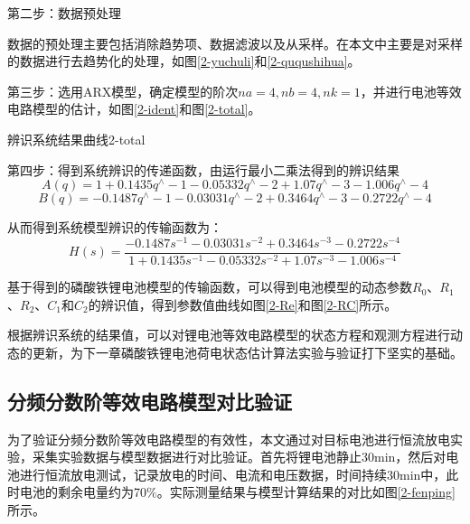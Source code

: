 第二步：数据预处理

数据的预处理主要包括消除趋势项、数据滤波以及从采样。在本文中主要是对采样的数据进行去趋势化的处理，如图\ref{2-yuchuli}和\ref{2-ququshihua}。

第三步：选用ARX模型，确定模型的阶次$na=4,nb=4,nk=1$，并进行电池等效电路模型的估计，如图\ref{2-ident}和图\ref{2-total}。

\begin{pics}[htbp]{辨识系统结果曲线}{2-total}
\end{pics}


第四步：得到系统辨识的传递函数，由运行最小二乘法得到的辨识结果
\begin{equation}
A\left( q \right)=1+0.1435{{q}^{\wedge }}-1-0.05332{{q}^{\wedge }}-2+1.07{{q}^{\wedge }}-3-1.006{{q}^{\wedge }}-4
\end{equation}
\begin{equation}
B\left( q \right)=-0.1487{{q}^{\wedge }}-1-0.03031{{q}^{\wedge }}-2+0.3464{{q}^{\wedge }}-3-0.2722{{q}^{\wedge }}-4
\end{equation}

从而得到系统模型辨识的传输函数为：
\begin{equation}
H\left( s \right)=\frac{-0.1487{{s}^{-1}}-0.03031{{s}^{-2}}+0.3464{{s}^{-3}}-0.2722{{s}^{-4}}}{1+0.1435{{s}^{-1}}-0.05332{{s}^{-2}}+1.07{{s}^{-3}}-1.006{{s}^{-4}}}
\end{equation}	
	  
	基于得到的磷酸铁锂电池模型的传输函数，可以得到电池模型的动态参数${{R}_{0}}$、${{R}_{1}}$、${{R}_{2}}$、${{C}_{1}}$和${{C}_{2}}$的辨识值，得到参数值曲线如图\ref{2-Re}和图\ref{2-RC}所示。

根据辨识系统的结果值，可以对锂电池等效电路模型的状态方程和观测方程进行动态的更新，为下一章磷酸铁锂电池荷电状态估计算法实验与验证打下坚实的基础。

\subsection{分频分数阶等效电路模型对比验证}
为了验证分频分数阶等效电路模型的有效性，本文通过对目标电池进行恒流放电实验，采集实验数据与模型数据进行对比验证。首先将锂电池静止30min，然后对电池进行恒流放电测试，记录放电的时间、电流和电压数据，时间持续30min中，此时电池的剩余电量约为70$\%$。实际测量结果与模型计算结果的对比如图\ref{2-fenping}所示。

